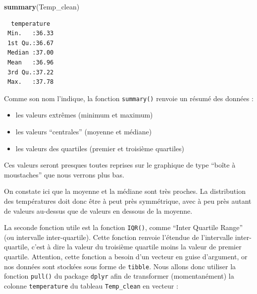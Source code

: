 \documentclass[
  a4paper,
]{article}
\newenvironment{Shaded}{\begin{snugshade}}{\end{snugshade}}
\newcommand{\KeywordTok}[1]{\textcolor[rgb]{0.12,0.11,0.11}{\textbf{#1}}}
\newcommand{\NormalTok}[1]{\textcolor[rgb]{0.12,0.11,0.11}{#1}}
\newcommand{\OperatorTok}[1]{\textcolor[rgb]{0.12,0.11,0.11}{#1}}
\newcommand{\StringTok}[1]{\textcolor[rgb]{0.75,0.01,0.01}{#1}}
\providecommand{\tightlist}{%
  \setlength{\itemsep}{0pt}\setlength{\parskip}{0pt}}
\begin{document}
\begin{Shaded}
\begin{Highlighting}[]
\KeywordTok{summary}\NormalTok{(Temp_clean)}
\end{Highlighting}
\end{Shaded}

\begin{verbatim}
  temperature   
 Min.   :36.33  
 1st Qu.:36.67  
 Median :37.00  
 Mean   :36.96  
 3rd Qu.:37.22  
 Max.   :37.78  
\end{verbatim}

Comme son nom l'indique, la fonction \texttt{summary()} renvoie un résumé des données :

\begin{itemize}
\tightlist
\item
  les valeurs extrêmes (minimum et maximum)
\item
  les valeurs ``centrales'' (moyenne et médiane)
\item
  les valeurs des quartiles (premier et troisième quartiles)
\end{itemize}

Ces valeurs seront presques toutes reprises sur le graphique de type ``boîte à moustaches'' que nous verrons plus bas.

On constate ici que la moyenne et la médiane sont très proches. La distribution des températures doit donc être à peut près symmétrique, avec à peu près autant de valeurs au-dessus que de valeurs en dessous de la moyenne.

La seconde fonction utile est la fonction \texttt{IQR()}, comme ``Inter Quartile Range'' (ou intervalle inter-quartile). Cette fonction renvoie l'étendue de l'intervalle inter-quartile, c'est à dire la valeur du troisième quartile moins la valeur de premier quartile. Attention, cette fonction a besoin d'un vecteur en guise d'argument, or nos données sont stockées sous forme de \texttt{tibble}. Nous allons donc utiliser la fonction \texttt{pull()} du package \texttt{dplyr} afin de transformer (momentanément) la colonne \texttt{temperature} du tableau \texttt{Temp\_clean} en vecteur :

\begin{Shaded}
\end{Shaded}
\end{document}
